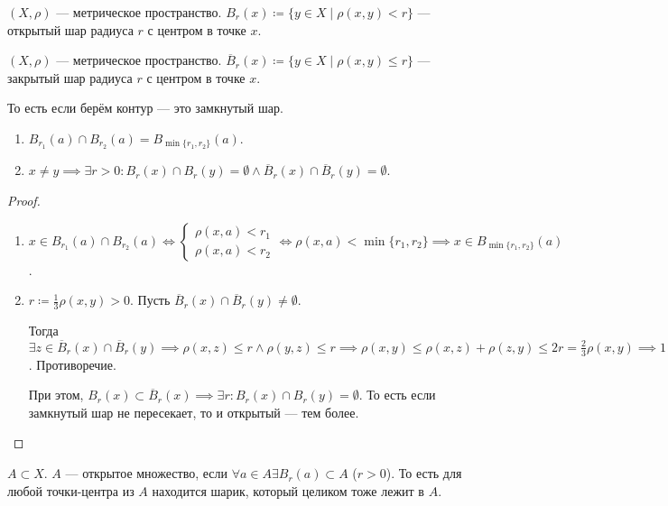 \begin{definition}
    $(X, \rho)$ --- метрическое пространство.  $B_r(x) \coloneqq \{y \in X \mid \rho(x, y) < r\}$ --- открытый шар радиуса  $r$ с центром в точке  $x$. 
\end{definition}
\begin{definition}
    $(X, \rho)$ --- метрическое пространство.  $\overline{B}_r(x) \coloneqq \{y \in X \mid \rho(x, y) \le r\}$ --- закрытый шар радиуса  $r$ с центром в точке  $x$.
    
    То есть если берём контур --- это замкнутый шар.
\end{definition}
\begin{properties}
    \begin{enumerate}
        \item $B_{r_1}(a) \cap B_{r_2}(a) = B_{\min\{r_1, r_2\}}(a)$.
        \item $x \neq y \implies \exists r > 0\!: B_r(x) \cap B_r(y) = \emptyset \land \overline{B}_r(x) \cap \overline{B}_r(y) = \emptyset$.
    \end{enumerate}
\end{properties}
\begin{proof}
    \begin{enumerate}
        \item $x \in B_{r_1}(a) \cap B_{r_2}(a) \iff \begin{cases} \rho(x, a) < r_1 \\ \rho(x, a) < r_2 \end{cases} \iff \rho(x, a) < \min\{r_1, r_2\} \implies x \in B_{\min\{r_1, r_2\}}(a)$.
        \item $r \coloneqq \frac{1}{3} \rho(x, y) > 0$. Пусть $\overline{B}_r(x) \cap \overline{B}_r(y) \neq \emptyset$. 

            Тогда  $\exists z \in \overline{B}_r(x) \cap \overline{B}_r(y) \implies \rho(x, z) \le r \land \rho(y, z) \le r \implies \rho(x, y) \le \rho(x, z) + \rho(z, y) \le 2r = \frac{2}{3} \rho(x, y) \implies 1 \le \frac{2}{3}$. Противоречие.

            При этом, $B_r(x) \subset \overline{B}_r(x) \implies \exists r\!: B_r(x) \cap B_r(y) = \emptyset$. То есть если замкнутый шар не пересекает, то и открытый --- тем более.
    \end{enumerate}
\end{proof}
\begin{definition}
    $A \subset X$.  $A$ --- открытое множество, если  $\forall a \in A \exists B_r(a) \subset A$ ($r > 0$). То есть для любой точки-центра из $A$ находится шарик, который целиком тоже лежит в $A$.
\end{definition}
